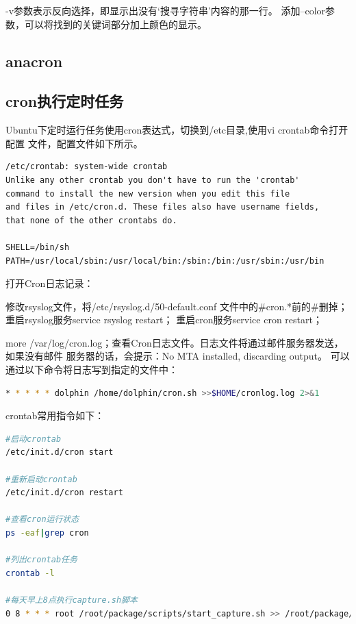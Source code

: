 \documentclass{book}
\begin{document}
-v参数表示反向选择，即显示出没有‘搜寻字符串’内容的那一行。
添加--color参数，可以将找到的关键词部分加上颜色的显示。

\subsection{anacron}

\subsection{cron执行定时任务}

Ubuntu下定时运行任务使用cron表达式，切换到/etc目录,使用vi crontab命令打开配置
文件，配置文件如下所示。

\begin{lstlisting}
/etc/crontab: system-wide crontab
Unlike any other crontab you don't have to run the 'crontab'
command to install the new version when you edit this file
and files in /etc/cron.d. These files also have username fields,
that none of the other crontabs do.

SHELL=/bin/sh
PATH=/usr/local/sbin:/usr/local/bin:/sbin:/bin:/usr/sbin:/usr/bin
\end{lstlisting}

打开Cron日志记录：

修改rsyslog文件，将/etc/rsyslog.d/50-default.conf 文件中的\#cron.*前的\#删掉；
重启rsyslog服务service rsyslog restart；
重启cron服务service cron restart；

more /var/log/cron.log；查看Cron日志文件。日志文件将通过邮件服务器发送，如果没有邮件
服务器的话，会提示：No MTA installed, discarding output。
可以通过以下命令将日志写到指定的文件中：

\begin{lstlisting}[language=Bash]
* * * * * dolphin /home/dolphin/cron.sh >>$HOME/cronlog.log 2>&1
\end{lstlisting}

crontab常用指令如下：

\begin{lstlisting}[language=Bash]
#启动crontab
/etc/init.d/cron start

#重新启动crontab
/etc/init.d/cron restart

#查看cron运行状态
ps -eaf|grep cron

#列出crontab任务
crontab -l

#每天早上8点执行capture.sh脚本
0 8 * * * root /root/package/scripts/start_capture.sh >> /root/package/capture.log
\end{lstlisting}
\end{document}
